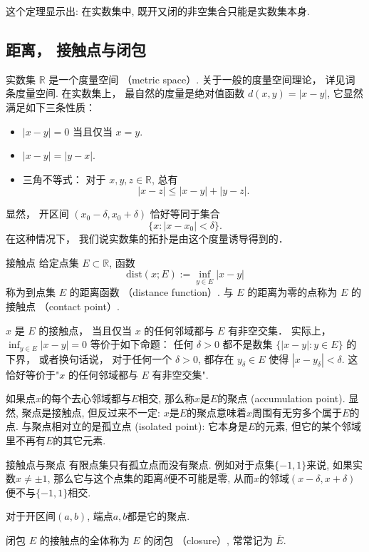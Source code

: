 这个定理显示出: 在实数集中, 既开又闭的非空集合只能是实数集本身.

\subsection{距离， 接触点与闭包}
实数集 $\mathbb{R}$ 是一个度量空间 （metric space）. 关于一般的度量空间理论， 详见词条度量空间. 在实数集上， 最自然的度量是绝对值函数 $d(x,y)=|x-y|$, 它显然满足如下三条性质：

\begin{itemize}
\item $|x-y|=0$ 当且仅当 $x=y$.
\item $|x-y|=|y-x|$.
\item 三角不等式： 对于 $x,y,z\in\mathbb{R}$, 总有
$$
|x-z|\leq|x-y|+|y-z|.
$$
\end{itemize}

显然， 开区间 $(x_0-\delta,x_0+\delta)$ 恰好等同于集合
$$
\{x:|x-x_0|<\delta\}.
$$
在这种情况下， 我们说实数集的拓扑是由这个度量诱导得到的．

\begin{definition}{接触点}
给定点集 $E\subset\mathbb{R}$, 函数
$$
\text{dist}(x;E):=\inf_{y\in E}|x-y|
$$
称为到点集 $E$ 的距离函数 （distance function）. 与 $E$ 的距离为零的点称为 $E$ 的接触点 （contact point）. 
\end{definition}
$x$ 是 $E$ 的接触点， 当且仅当 $x$ 的任何邻域都与 $E$ 有非空交集． 实际上， $\inf_{y\in E}|x-y|=0$ 等价于如下命题： 任何 $\delta>0$ 都不是数集 $\{|x-y|:y\in E\}$ 的下界， 或者换句话说， 对于任何一个 $\delta>0$, 都存在 $y_\delta\in E$ 使得 $|x-y_\delta|<\delta$. 这恰好等价于"$x$ 的任何邻域都与 $E$ 有非空交集".

如果点$x$的每个去心邻域都与$E$相交, 那么称$x$是$E$的聚点 (accumulation point). 显然, 聚点是接触点, 但反过来不一定: $x$是$E$的聚点意味着$x$周围有无穷多个属于$E$的点. 与聚点相对立的是孤立点 (isolated point): 它本身是$E$的元素, 但它的某个邻域里不再有$E$的其它元素.

\begin{example}{接触点与聚点}
有限点集只有孤立点而没有聚点. 例如对于点集$\{-1,1\}$来说, 如果实数$x\neq\pm1$, 那么它与这个点集的距离$\delta$便不可能是零, 从而$x$的邻域$(x-\delta,x+\delta)$便不与$\{-1,1\}$相交.

对于开区间$(a,b)$, 端点$a,b$都是它的聚点.
\end{example}

\begin{definition}{闭包}
$E$ 的接触点的全体称为 $E$ 的闭包 （closure）, 常常记为 $\bar E$.
\end{definition}

